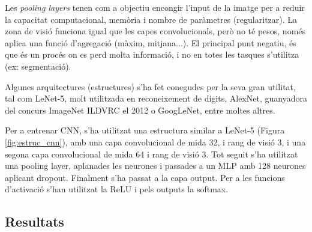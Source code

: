 \documentclass[12pt, spanish]{article}
\begin{document}
Les \textit{pooling layers} tenen com a objectiu encongir l'input de la imatge per a reduir la capacitat computacional, memòria i nombre de paràmetres (regularitzar). La zona de visió funciona igual que les capes convolucionals, però no té pesos, només aplica una funció d'agregació (màxim, mitjana...). El principal punt negatiu, és que és un procés on es perd molta informació, i no en totes les tasques s'utilitza (ex: segmentació).

Algunes arquitectures (estructures) s'ha fet conegudes per la seva gran utilitat, tal com LeNet-5, molt utilitzada en reconeixement de dígits, AlexNet, guanyadora del concurs ImageNet ILDVRC el 2012 o GoogLeNet, entre moltes altres.

Per a entrenar CNN, s'ha utilitzat una estructura similar a LeNet-5 (Figura \ref{fig:estruc_cnn}), amb una capa convolucional de mida 32, i rang de visió 3, i una segona capa convolucional de mida 64 i rang de visió 3. Tot seguit s'ha utilitzat una pooling layer, aplanades les neurones i passades a un MLP amb 128 neurones aplicant dropout. Finalment s'ha passat a la capa output. Per a les funcions d'activació s'han utilitzat la ReLU i pels outputs la softmax.




\subsection{Resultats}
\end{document}

